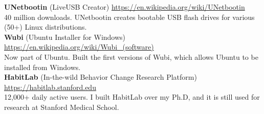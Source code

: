 
\textbf{UNetbootin} (LiveUSB Creator) \hfill \url{https://en.wikipedia.org/wiki/UNetbootin}\\ %
\textcolor{sectcol}{40 million downloads.} UNetbootin creates bootable USB flash drives for various (50+) Linux distributions.\\ %

\textbf{Wubi} (Ubuntu Installer for Windows) \hfill \url{https://en.wikipedia.org/wiki/Wubi_(software)}\\ %
\textcolor{sectcol}{Now part of Ubuntu.} Built the first versions of Wubi, which allows Ubuntu to be installed from Windows.\\ %

\textbf{HabitLab} (In-the-wild Behavior Change Research Platform) \hfill \url{https://habitlab.stanford.edu}\\ %
\textcolor{sectcol}{12,000+ daily active users.} I built HabitLab over my Ph.D, and it is still used for research at Stanford Medical School.\\ %

